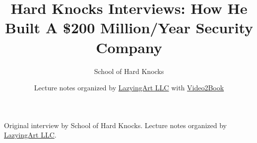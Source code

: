\documentclass[11pt,oneside]{book}
\begin{document}
\frontmatter
\title{Hard Knocks Interviews: How He Built A \$200 Million/Year Security Company}
\author{School of Hard Knocks}
\date{Lecture notes organized by \href{https://lazying.art}{LazyingArt LLC} with \href{https://github.com/lachlanchen/Video2Book}{Video2Book}}
\maketitle
\begin{center}
\small Original interview by School of Hard Knocks. Lecture notes organized by \href{https://lazying.art}{LazyingArt LLC}.
\end{center}
\clearpage
\mainmatter

\end{document}
